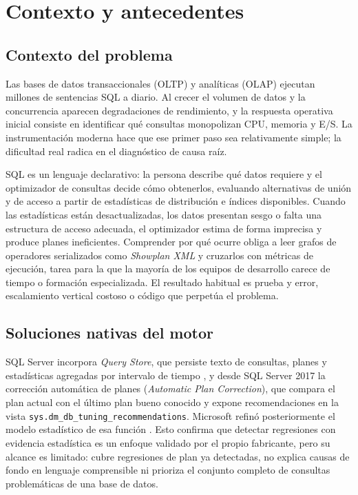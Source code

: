 \documentclass[12pt,a4paper]{article}
\begin{document}
\section{Contexto y antecedentes}

\subsection{Contexto del problema}

Las bases de datos transaccionales (OLTP) y analíticas (OLAP) ejecutan millones de sentencias SQL a diario. Al crecer el volumen de datos y la concurrencia aparecen degradaciones de rendimiento, y la respuesta operativa inicial consiste en identificar qué consultas monopolizan CPU, memoria y E/S. La instrumentación moderna hace que ese primer paso sea relativamente simple; la dificultad real radica en el diagnóstico de causa raíz.

SQL es un lenguaje declarativo: la persona describe qué datos requiere y el optimizador de consultas decide cómo obtenerlos, evaluando alternativas de unión y de acceso a partir de estadísticas de distribución e índices disponibles. Cuando las estadísticas están desactualizadas, los datos presentan sesgo o falta una estructura de acceso adecuada, el optimizador estima de forma imprecisa y produce planes ineficientes. Comprender por qué ocurre obliga a leer grafos de operadores serializados como \textit{Showplan XML} y cruzarlos con métricas de ejecución, tarea para la que la mayoría de los equipos de desarrollo carece de tiempo o formación especializada. El resultado habitual es prueba y error, escalamiento vertical costoso o código que perpetúa el problema.

\subsection{Soluciones nativas del motor}

SQL Server incorpora \textit{Query Store}, que persiste texto de consultas, planes y estadísticas agregadas por intervalo de tiempo \cite{ms-qs-collect}, y desde SQL Server 2017 la corrección automática de planes (\textit{Automatic Plan Correction}), que compara el plan actual con el último plan bueno conocido y expone recomendaciones en la vista \texttt{sys.dm\_db\_tuning\_recommendations}. Microsoft refinó posteriormente el modelo estadístico de esa función \cite{ms-apc-2026}. Esto confirma que detectar regresiones con evidencia estadística es un enfoque validado por el propio fabricante, pero su alcance es limitado: cubre regresiones de plan ya detectadas, no explica causas de fondo en lenguaje comprensible ni prioriza el conjunto completo de consultas problemáticas de una base de datos.
\end{document}
